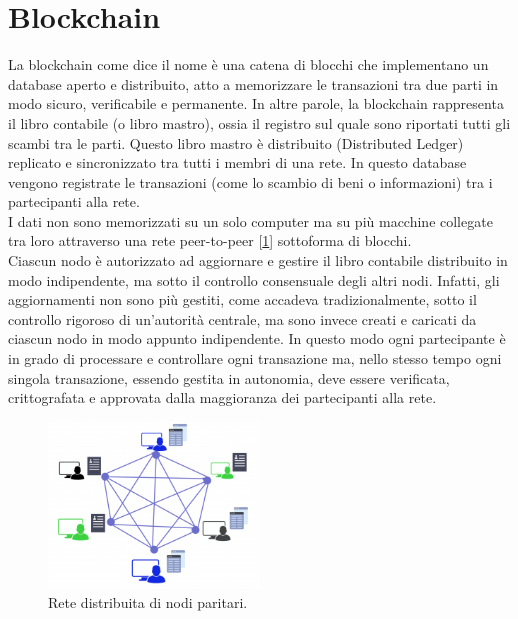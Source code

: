 \section{Blockchain}
\label{sec:blockchain}

La blockchain come dice il nome è una catena di blocchi che implementano un database  aperto e distribuito, atto a memorizzare le transazioni tra due parti in modo sicuro, verificabile e permanente. In altre parole, la blockchain rappresenta il libro contabile (o libro mastro), ossia il registro sul quale sono riportati tutti gli scambi tra le parti. Questo libro mastro è distribuito (Distributed Ledger) replicato e sincronizzato tra tutti i membri di una rete. In questo database vengono registrate le transazioni (come lo scambio di beni o informazioni) tra i partecipanti alla rete.
\\I dati non sono memorizzati su un solo computer ma su più macchine collegate tra loro attraverso una rete peer-to-peer [\ref{fig:blockchainNetwork}] sottoforma di blocchi.
\\Ciascun nodo è autorizzato ad aggiornare e gestire il libro contabile distribuito in modo indipendente, ma sotto il controllo consensuale degli altri nodi. Infatti, gli aggiornamenti non sono più gestiti, come accadeva tradizionalmente, sotto il controllo rigoroso di un’autorità centrale, ma sono invece creati e caricati da ciascun nodo in modo appunto indipendente. In questo modo ogni partecipante è in grado di processare e controllare ogni transazione ma, nello stesso tempo ogni singola transazione, essendo gestita in autonomia, deve essere verificata, crittografata e approvata dalla maggioranza dei partecipanti alla rete. 

\begin{figure}[H]
	\centering
	\includegraphics[width=0.5\textwidth]{images/blockchainNetwork.png}
	\caption{Rete distribuita di nodi paritari.}
	\label{fig:blockchainNetwork}
\end{figure}

